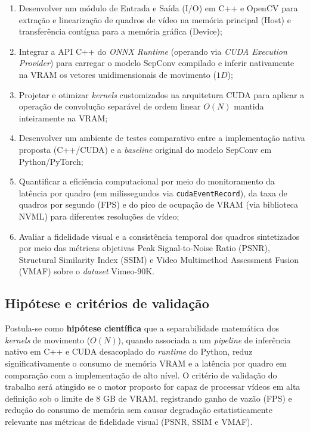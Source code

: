 \documentclass[
    12pt,                %
    openright,           %
    oneside,             %
    a4paper,             %
    english,             %
    brazil               %
]{abntex2}
\begin{document}
\begin{enumerate}
    \item Desenvolver um módulo de Entrada e Saída (I/O) em C++ e OpenCV para extração e linearização de quadros de vídeo na memória principal (Host) e transferência contígua para a memória gráfica (Device);
    \item Integrar a API C++ do \textit{ONNX Runtime} (operando via \textit{CUDA Execution Provider}) para carregar o modelo SepConv compilado e inferir nativamente na VRAM os vetores unidimensionais de movimento ($1D$);
    \item Projetar e otimizar \textit{kernels} customizados na arquitetura CUDA para aplicar a operação de convolução separável de ordem linear $O(N)$ mantida inteiramente na VRAM;
    \item Desenvolver um ambiente de testes comparativo entre a implementação nativa proposta (C++/CUDA) e a \textit{baseline} original do modelo SepConv em Python/PyTorch;
    \item Quantificar a eficiência computacional por meio do monitoramento da latência por quadro (em milissegundos via \texttt{cudaEventRecord}), da taxa de quadros por segundo (FPS) e do pico de ocupação de VRAM (via biblioteca NVML) para diferentes resoluções de vídeo;
    \item Avaliar a fidelidade visual e a consistência temporal dos quadros sintetizados por meio das métricas objetivas Peak Signal-to-Noise Ratio (PSNR), Structural Similarity Index (SSIM) e Video Multimethod Assessment Fusion (VMAF) sobre o \textit{dataset} Vimeo-90K.
\end{enumerate}

\subsection{Hipótese e critérios de validação}

Postula-se como \textbf{hipótese científica} que a separabilidade matemática dos \textit{kernels} de movimento ($O(N)$), quando associada a um \textit{pipeline} de inferência nativo em C++ e CUDA desacoplado do \textit{runtime} do Python, reduz significativamente o consumo de memória VRAM e a latência por quadro em comparação com a implementação de alto nível. O critério de validação do trabalho será atingido se o motor proposto for capaz de processar vídeos em alta definição sob o limite de 8 GB de VRAM, registrando ganho de vazão (FPS) e redução do consumo de memória sem causar degradação estatisticamente relevante nas métricas de fidelidade visual (PSNR, SSIM e VMAF).
\end{document}
